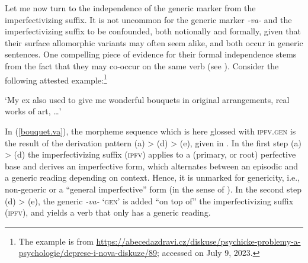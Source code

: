 \documentclass[output=paper,colorlinks,citecolor=brown]{langscibook}
\begin{document}
Let me now turn to the independence of the generic marker from the imperfectivizing suffix. 
It is not uncommon 
for the generic marker \textit{-va-} 
and the imperfectivizing suffix to be confounded, both notionally and formally, given that their surface allomorphic variants may often seem alike, and both 
occur in generic sentences. 
One compelling piece of evidence for their formal independence 
stems from the fact that they may co-occur on the same verb (see \citealt{filip1997suigenva}). Consider the following attested example:\footnote{The example is from \url{https://abecedazdravi.cz/diskuse/psychicke-problemy-a-psychologie/deprese-i-nova-diskuze/89}; accessed on July 9, 2023.}

\glt `My ex also used to give me wonderful bouquets in original arrangements, real works of art, \ldots'
\z 

\noindent
In  (\ref{bouquet.va}), the morpheme sequence which is here glossed with \textsc{ipfv.gen} is the result of the derivation pattern (a) > (d) > (e), given
in . In the first step (a) > (d) the imperfectivizing suffix (\textsc{ipfv}) applies to a (primary, or root) perfective base and derives an imperfective form, which alternates between an episodic and a generic reading depending on context. Hence, it is unmarked for genericity, i.e., non-generic or  a ``general imperfective'' form
(in the sense of \citealt{Comrie1976}).
In the second step (d) > (e), the generic \textit{-va-} `\textsc{gen}' is added ``on top of'' the imperfectivizing suffix (\textsc{ipfv}), and yields a verb that only has a generic reading.  
\end{document}
